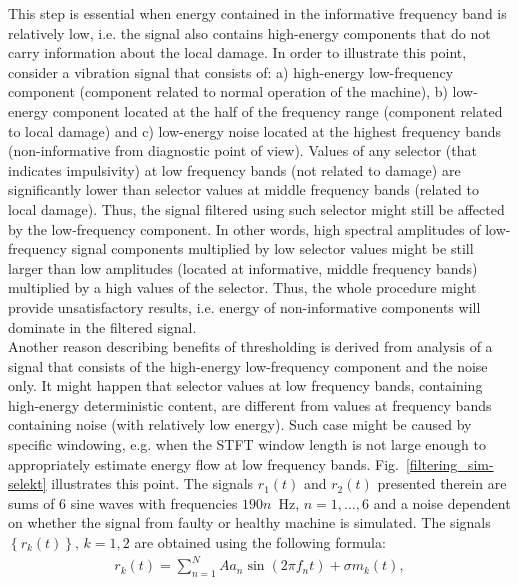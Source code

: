 This step is essential when energy contained in the informative frequency band is relatively low, i.e. the signal also contains high-energy components that do not carry information about the local damage. In order to illustrate this point, consider a vibration signal that consists of: a) high-energy low-frequency component (component related to normal operation of the machine), b) low-energy component located at the half of the frequency range (component related to local damage) and c) low-energy noise located at the highest frequency bands (non-informative from diagnostic point of view). Values of any selector (that indicates impulsivity) at low frequency bands (not related to damage) are significantly lower than selector values at middle frequency bands (related to local damage). Thus, the signal filtered using such selector might still be affected by the low-frequency component. In other words, high spectral amplitudes of low-frequency signal components multiplied by low selector values might be still larger than low amplitudes (located at informative, middle frequency bands) multiplied by a high values of the selector. Thus, the whole procedure might provide unsatisfactory results, i.e. energy of non-informative components will dominate in the filtered signal.\\
Another reason describing benefits of thresholding is derived from analysis of a signal that consists of the high-energy low-frequency component and the noise only. It might happen that selector values at low frequency bands, containing high-energy  deterministic content, are different from values at frequency bands containing noise (with relatively low energy). Such case might be caused by specific windowing, e.g. when the STFT window length is not large enough to appropriately estimate energy flow at low frequency bands. Fig.~\ref{filtering_sim-selekt} illustrates this point. The signals $r_1(t)$ and $r_2(t)$ presented therein are sums of 6 sine waves with frequencies $190n$~Hz, $n=1,\ldots,6$ and a noise dependent on whether the signal from faulty or healthy machine is simulated. The signals $\left\{r_k(t)\right\},\,k=1,2$ are obtained using the following formula:
\begin{eqnarray}
r_k(t)=\sum^{N}_{n=1}{ A a_n \sin(2\pi f_n t)} + \sigma m_k(t),
\end{eqnarray}
